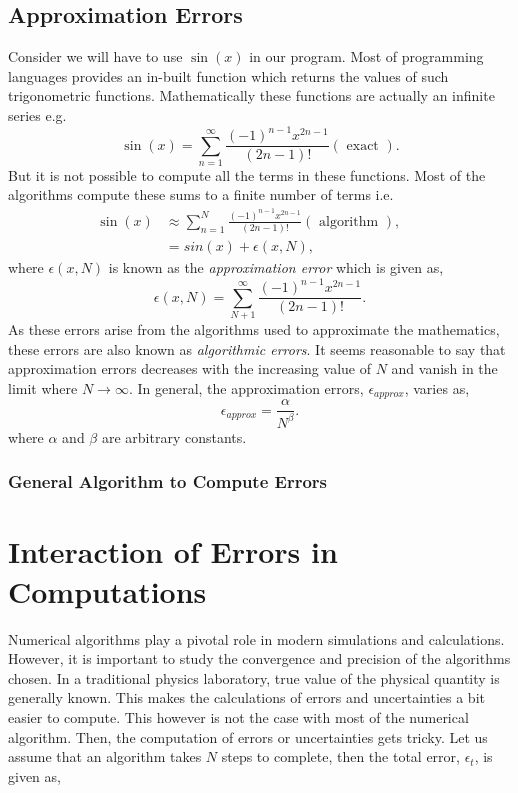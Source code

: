 \documentclass[a4,12pt]{article}
\numberwithin{equation}{subsection}
\begin{document}
\subsection{Approximation Errors}
Consider we will have to use $\sin(x)$ in our program. Most of programming languages provides an in-built function which returns the values of such trigonometric functions. Mathematically these functions are actually an infinite series e.g. 
$$\sin(x) = \sum^{\infty}_{n=1} \frac{(-1)^{n-1}x^{2n-1}}{(2n-1)!} (\text{ exact }).$$
But it is not possible to compute all the terms in these functions. Most of the algorithms compute these sums to a finite number of terms i.e.
\begin{align}
\sin(x) &\approx \sum^{N}_{n=1} \frac{(-1)^{n-1}x^{2n-1}}{(2n-1)!} (\text{ algorithm }), && \\
        &= sin(x)+\epsilon(x,N), && 
 \end{align}  
 where $\epsilon(x,N)$ is known as the \textit{approximation error} which is given as,
$$\epsilon(x,N) = \sum^{\infty}_{N+1} \frac{(-1)^{n-1}x^{2n-1}}{(2n-1)!} .$$
As these errors arise from the algorithms used to approximate the mathematics, these errors are also known as \textit{algorithmic errors}. It seems reasonable to say that approximation errors decreases with the increasing value of $N$ and vanish in the limit where $N \to \infty$. In general, the approximation errors, $\epsilon_{approx}$, varies as, 
$$\epsilon_{approx} = \frac{\alpha}{N^{\beta}}.$$
where $\alpha$ and $\beta$ are arbitrary constants.

\subsubsection{General Algorithm to Compute Errors}

\section{Interaction of Errors in Computations}
Numerical algorithms play a pivotal role in modern simulations and calculations. However, it is important to study the convergence and precision of the algorithms chosen. In a traditional physics laboratory, true value of the physical quantity is generally known. This makes the calculations of errors and uncertainties a bit easier to compute. This however is not the case with most of the numerical algorithm. Then, the computation of errors or uncertainties gets tricky. Let us assume that an algorithm takes $N$ steps to complete, then the total error, $\epsilon_{t}$, is given as,
\end{document}
